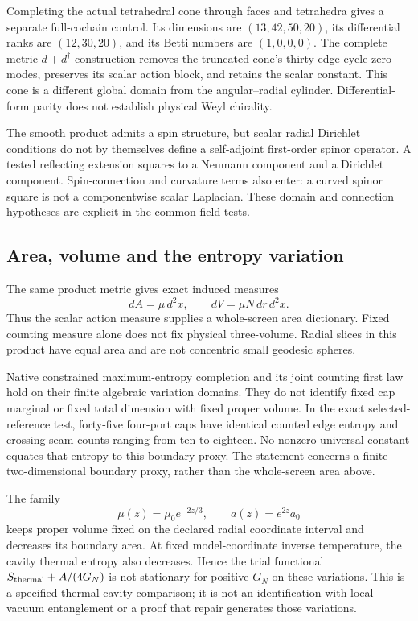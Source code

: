 Completing the actual tetrahedral cone through faces and tetrahedra gives
a separate full-cochain control. Its dimensions are \((13,42,50,20)\), its
differential ranks are \((12,30,20)\), and its Betti numbers are
\((1,0,0,0)\). The complete metric \(d+d^\dagger\) construction removes the
truncated cone's thirty edge-cycle zero modes, preserves its scalar action
block, and retains the scalar constant. This cone is a different global
domain from the angular--radial cylinder. Differential-form parity does
not establish physical Weyl chirality.

The smooth product admits a spin structure, but scalar radial Dirichlet
conditions do not by themselves define a self-adjoint first-order spinor
operator. A tested reflecting extension squares to a Neumann component
and a Dirichlet component. Spin-connection and curvature terms also enter:
a curved spinor square is not a componentwise scalar Laplacian. These
domain and connection hypotheses are explicit in the common-field tests.

\subsection{Area, volume and the entropy variation}

The same product metric gives exact induced measures
\[
 dA=\mu\,d^2x,\qquad dV=\mu N\,dr\,d^2x.
\]
Thus the scalar action measure supplies a whole-screen area dictionary.
Fixed counting measure alone does not fix physical three-volume. Radial
slices in this product have equal area and are not concentric small
geodesic spheres.

Native constrained maximum-entropy completion and its joint counting first
law hold on their finite algebraic variation domains. They do not identify
fixed cap marginal or fixed total dimension with fixed proper volume. In
the exact selected-reference test, forty-five four-port caps have identical
counted edge entropy and crossing-seam counts ranging from ten to eighteen.
No nonzero universal constant equates that entropy to this boundary proxy.
The statement concerns a finite two-dimensional boundary proxy, rather than
the whole-screen area above.

The family
\[
 \mu(z)=\mu_0e^{-2z/3},\qquad a(z)=e^{2z}a_0
\]
keeps proper volume fixed on the declared radial coordinate interval and
decreases its boundary area. At fixed model-coordinate inverse temperature,
the cavity thermal entropy also decreases. Hence the trial functional
\(S_{\rm thermal}+A/(4G_N)\) is not stationary for positive \(G_N\) on
these variations. This is a specified thermal-cavity comparison; it is not
an identification with local vacuum entanglement or a proof that repair
generates those variations.


